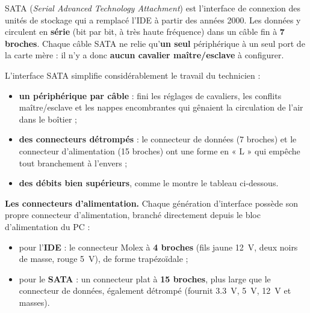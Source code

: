 \documentclass[11pt]{article}
\newcommand{\cle}[1]{{\popxbold\color{popdark}#1}}
\newcounter{popsec}
\newcounter{popsub}
\newcommand{\courssub}[1]{%
  \stepcounter{popsub}%
  \par\vspace{9pt}\noindent{\popxbold\fontsize{11.5}{13}\selectfont\color{popink}{\color{poporange}\thepopsec.\thepopsub}\hspace{6pt}#1}\par\nopagebreak\vspace{4pt}
}
\begin{document}
\courssub{L'interface SATA}

\begin{definition}[SATA]
\cle{SATA} (\emph{Serial Advanced Technology Attachment}) est l'interface de connexion des unités de stockage qui a remplacé l'IDE à partir des années 2000. Les données y circulent en \textbf{série} (bit par bit, à très haute fréquence) dans un câble fin à \textbf{7 broches}. Chaque câble SATA ne relie qu'\textbf{un seul} périphérique à un seul port de la carte mère : il n'y a donc \textbf{aucun cavalier maître/esclave} à configurer.
\end{definition}

L'interface SATA simplifie considérablement le travail du technicien :

\begin{itemize}
\item \textbf{un périphérique par câble} : fini les réglages de cavaliers, les conflits maître/esclave et les nappes encombrantes qui gênaient la circulation de l'air dans le boîtier ;
\item \textbf{des connecteurs détrompés} : le connecteur de données (7 broches) et le connecteur d'alimentation (15 broches) ont une forme en « L » qui empêche tout branchement à l'envers ;
\item \textbf{des débits bien supérieurs}, comme le montre le tableau ci-dessous.
\end{itemize}

\textbf{Les connecteurs d'alimentation.} Chaque génération d'interface possède son propre connecteur d'alimentation, branché directement depuis le bloc d'alimentation du PC :

\begin{itemize}
\item pour l'\textbf{IDE} : le connecteur \cle{Molex} à \textbf{4 broches} (fils jaune \SI{12}{V}, deux noirs de masse, rouge \SI{5}{V}), de forme trapézoïdale ;
\item pour le \textbf{SATA} : un connecteur plat à \textbf{15 broches}, plus large que le connecteur de données, également détrompé (fournit \SI{3,3}{V}, \SI{5}{V}, \SI{12}{V} et masses).
\end{itemize}
\end{document}
